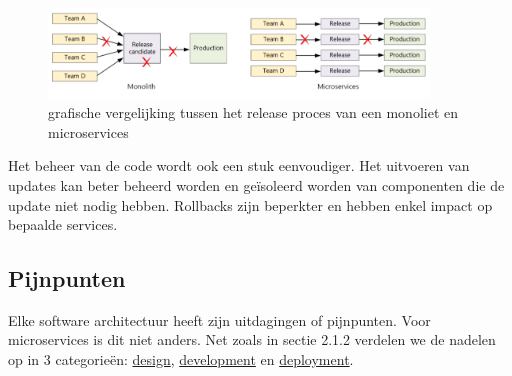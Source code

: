 \begin{figure}[!htb]
    \centering
    \includegraphics[width=0.9\textwidth]{PipelinesVS.png}    
    \caption{grafische vergelijking tussen het release proces van een monoliet en microservices \label{pipelin}}
\end{figure}

Het beheer van de code wordt ook een stuk eenvoudiger. Het uitvoeren van updates kan beter beheerd worden en geïsoleerd worden van componenten die de update niet nodig hebben. Rollbacks zijn beperkter en hebben enkel impact op bepaalde services.


\subsection{Pijnpunten}

Elke software architectuur heeft zijn uitdagingen of pijnpunten. Voor microservices is dit niet anders. Net zoals in sectie 2.1.2 verdelen we de nadelen op in 3 categorieën: \underline{design}, \underline{development} en \underline{deployment}.\\ \\

